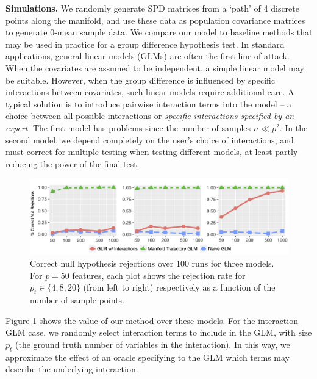 \textbf{Simulations.} We randomly generate SPD matrices from a `path' of 4 discrete points along the manifold, and use these data 
as population 
covariance matrices to generate 0-mean sample data. 
We compare our model to baseline methods that may be used in practice for a
group difference hypothesis test. In standard applications, general linear models (GLMs) are often the first line of attack. 
When the covariates are assumed to be independent, a simple linear model may be suitable. 
However, when the group difference is influenced by specific interactions between covariates, such linear models require additional care. 
A typical solution is to introduce pairwise interaction terms into the model -- a choice between 
all possible interactions or \textit{specific interactions specified by an expert}. The first model has 
problems since the number of samples $n \ll p^2$. In the second model, we depend completely on the user's choice of interactions, 
and must correct for multiple testing when testing different models, at least partly reducing the power of the final test.
%
\begin{figure}
	\begin{center}
		\includegraphics[width=\textwidth]{diss/3_covtraj/figs/sim_results.png}
		\caption[Synthetic Hypothesis Testing Results.]{\label{fg:sim_graphs}{\footnotesize Correct null hypothesis rejections over 100 runs for three models. For $p = 50$ features, each plot shows the rejection rate
				for $p_t \in \{4, 8, 20\}$ (from left to right) respectively as a function of the number of sample points.} }
	\end{center}
\end{figure}
%	
Figure \ref{fg:sim_graphs} shows the value of our method over these models. For the interaction GLM case, we randomly select interaction terms to include in the GLM, with size $p_t$ (the ground truth number of variables in the interaction). In this way, we approximate the effect of an oracle specifying to the GLM which terms may describe the underlying interaction. 

